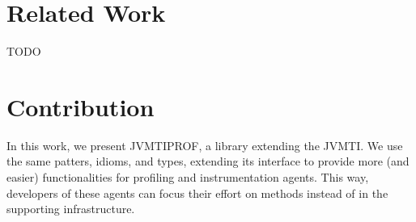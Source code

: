 
\section{Related Work}

TODO











\section{Contribution}

In this work, we present JVMTIPROF, a library extending the JVMTI. We use the same patters, idioms, and types, extending its interface to provide more (and easier) functionalities for profiling and instrumentation agents. This way, developers of these agents can focus their effort on methods instead of in the supporting infrastructure.

